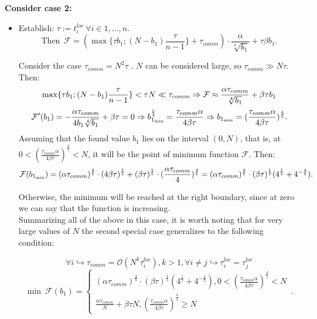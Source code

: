 \documentclass{article}
\theoremstyle{definition}
\theoremstyle{plain}
\begin{document}
\textbf{Consider case 2:}
\begin{itemize}
\item []
Establish: $\tau := t_i^{loc}~ \forall i \in {1,\ldots, n} $. 
\begin{equation}
        \text{Then} ~ ~\mathcal{F} = (\max\{\tau b_1; (N-b_1) \frac{\tau}{n-1}\} + \tau_{comm}) \cdot \frac{\alpha}{\sqrt[4]{b_1}}+\tau \beta b_1. 
\end{equation}

Consider the case $\tau_{comm} = N^2 \tau$ . $N$ can be considered large, so $\tau_{comm} \gg N\tau$. Then:
\begin{equation}
    \notag
     \max \{\tau b_1; (N-b_1)\frac{\tau}{n-1}\} < \tau N \ll \tau_{comm}\Rightarrow \mathcal{F} \approx \frac{\alpha \tau_{comm}}{\sqrt[4]{b_1}} + \beta \tau b_1 
\end{equation}
\begin{equation}
    \notag
    \mathcal{F}' (b_1) = -\frac{\alpha \tau_{comm}}{4b_1\sqrt[4]{b_1}} + \beta \tau = 0 \Rightarrow b_{1_{\min}}^\frac{5}{4} = \frac{\tau _{comm}\alpha}{4\beta\tau}\Rightarrow b_{1_{\min}} = (\frac{\tau _{comm}\alpha}{4\beta\tau})^{\frac{4}{5}}.
\end{equation}
Assuming that the found value $b_1$ lies on the interval $(0, N) $, that is, at $0 < (\frac{\tau _{comm}\alpha}{4\beta\tau})^{\frac{4}{5}} < N$, it will be the point of minimum function $\mathcal{F}$. Then:
\begin{equation}
    \notag
    \mathcal{F}(b_{1_{\min}}) = (\alpha \tau_{comm})^\frac{4}{5} \cdot (4\beta\tau)^\frac{1}{5} + (\beta \tau)^\frac{1}{5}\cdot(\frac{\alpha \tau_{comm}}{4})^\frac{4}{5} = (\alpha \tau_{comm})^\frac{4}{5}\cdot (\beta\tau)^\frac{1}{5}(4^\frac{1}{5} + 4^{-\frac{4}{5}}).
\end{equation}
    
Otherwise, the minimum will be reached at the right boundary, since at zero we can say that the function is increasing.
    \\
Summarizing all of the above in this case, it is worth noting that for very large values of $N$ the second special case generalizes to the following condition:

\begin {equation} 
    \forall i  \hookrightarrow \tau_{comm} = \mathcal{O}( N^k \tau_i^{loc}), k >1 , \forall i\neq j\hookrightarrow \tau_i^{loc} = \tau_j^{loc}
\end {equation}
\begin {equation}          
\min ~ {\mathcal{F}}(b_1) = \begin{cases}
      (\alpha \tau_{comm})^\frac{4}{5}\cdot (\beta\tau)^\frac{1}{5}(4^\frac{1}{5} + 4^{-\frac{4}{5}}),  0 < (\frac{\tau _{comm}\alpha}{4\beta\tau})^{\frac{4}{5}} < N\\
      \frac{\alpha\tau _{comm}}{N} + \beta \tau N , (\frac{\tau _{comm}\alpha}{4\beta\tau})^{\frac{4}{5}} \geq N
    \end{cases}\,.
\end {equation}
\end{itemize}
\end{document}

